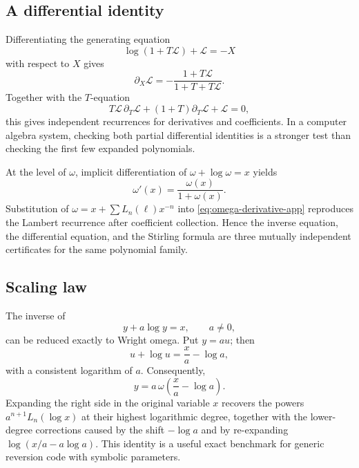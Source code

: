 \documentclass[11pt,oneside]{article}
\numberwithin{equation}{section}
\theoremstyle{definition}
\begin{document}
\subsection{A differential identity}

Differentiating the generating equation
\[
  \log(1+T\mathcal L)+\mathcal L=-X
\]
with respect to \(X\) gives
\begin{equation}\label{eq:Lambert-generating-X-derivative}
  \partial_X\mathcal L
  =-\frac{1+T\mathcal L}{1+T+T\mathcal L}.
\end{equation}
Together with the \(T\)-equation
\[
  T\mathcal L\,\partial_T\mathcal L
  +(1+T)\partial_T\mathcal L+\mathcal L=0,
\]
this gives independent recurrences for derivatives and coefficients.  In a
computer algebra system, checking both partial differential identities is a
stronger test than checking the first few expanded polynomials.

At the level of \(\omega\), implicit differentiation of
\(\omega+\log\omega=x\) yields
\begin{equation}\label{eq:omega-derivative-app}
  \omega'(x)=\frac{\omega(x)}{1+\omega(x)}.
\end{equation}
Substitution of \(\omega=x+\sum L_n(\ell)x^{-n}\) into
\eqref{eq:omega-derivative-app} reproduces the Lambert recurrence after
coefficient collection.  Hence the inverse equation, the differential equation,
and the Stirling formula are three mutually independent certificates for the
same polynomial family.

\subsection{Scaling law}

The inverse of
\begin{equation}\label{eq:scaled-Lambert-map}
  y+a\log y=x,
  \qquad a\ne0,
\end{equation}
can be reduced exactly to Wright omega.  Put \(y=a u\); then
\[
  u+\log u=\frac{x}{a}-\log a,
\]
with a consistent logarithm of \(a\).  Consequently,
\begin{equation}\label{eq:scaled-omega-exact}
  y=a\,\omega\!\left(\frac{x}{a}-\log a\right).
\end{equation}
Expanding the right side in the original variable \(x\) recovers the powers
\(a^{n+1}L_n(\log x)\) at their highest logarithmic degree, together with the
lower-degree corrections caused by the shift \(-\log a\) and by re-expanding
\(\log(x/a-a\log a)\).  This identity is a useful exact benchmark for generic
reversion code with symbolic parameters.
\end{document}
